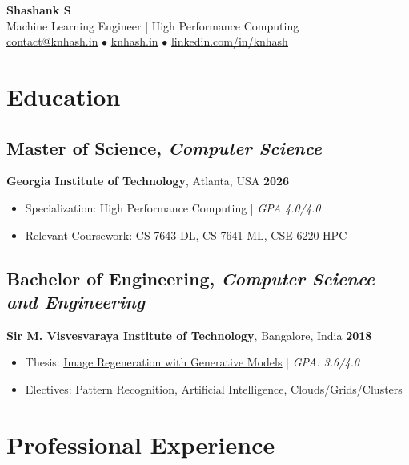 \documentclass[11pt,letterpaper]{article}
\let\oldhref\href
\renewcommand{\href}[2]{\uline{\oldhref{#1}{#2}}}
\begin{document}
\begin{center}
    {\Huge\selectfont\bfseries Shashank S} \\[7pt]
    {\large Machine Learning Engineer | High Performance Computing} \\[4pt]
    \href{mailto:contact@knhash.in}{contact@knhash.in} $\bullet$ 
    \href{https://knhash.in}{knhash.in} $\bullet$ 
    \href{https://linkedin.com/in/knhash}{linkedin.com/in/knhash}
\end{center}

\section{Education}

\subsection{Master of Science, \textit{Computer Science}}
	\textbf{Georgia Institute of Technology}, Atlanta, USA \hfill \textbf{2026}
\begin{itemize}
    \item Specialization: High Performance Computing | \textit{GPA 4.0/4.0}
    \item Relevant Coursework: CS 7643 DL, CS 7641 ML, CSE 6220 HPC
\end{itemize}

\subsection{Bachelor of Engineering, \textit{Computer Science and Engineering}}
	\textbf{Sir M. Visvesvaraya Institute of Technology}, Bangalore, India \hfill \textbf{2018}
\begin{itemize}
    \item Thesis: \href{https://knhash.github.io/files/ImageRegenerationWithGenerativeModels.pdf}{Image Regeneration with Generative Models} | \textit{GPA: 3.6/4.0}
    \item Electives: Pattern Recognition, Artificial Intelligence, Clouds/Grids/Clusters
\end{itemize}

\section{Professional Experience}
\end{document}
